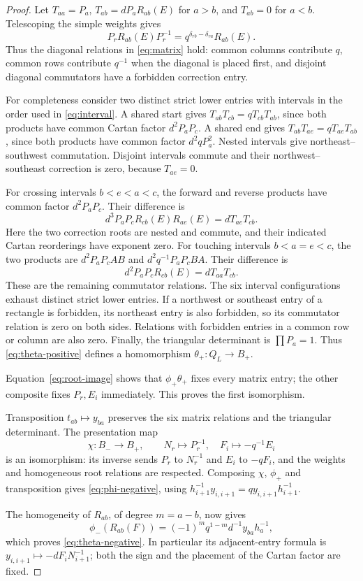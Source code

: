 \documentclass[11pt]{article}
\theoremstyle{definition}
\theoremstyle{remark}
\begin{document}
\begin{proof}
Let $T_{aa}=P_a$, $T_{ab}=dP_aR_{ab}(E)$ for $a>b$, and $T_{ab}=0$ for $a<b$. Telescoping the simple weights gives
\[
 P_rR_{ab}(E)P_r^{-1}=q^{\delta_{rb}-\delta_{ra}}R_{ab}(E).
\]
Thus the diagonal relations in \eqref{eq:matrix} hold: common columns contribute $q$, common rows contribute $q^{-1}$ when the diagonal is placed first, and disjoint diagonal commutators have a forbidden correction entry.

For completeness consider two distinct strict lower entries with intervals in the order used in \eqref{eq:interval}. A shared start gives
$T_{ab}T_{cb}=qT_{cb}T_{ab}$, since both products have common Cartan factor $d^2P_aP_c$. A shared end gives
$T_{ab}T_{ae}=qT_{ae}T_{ab}$, since both products have common factor $d^2qP_a^2$. Nested intervals give northeast--southwest commutation. Disjoint intervals commute and their northwest--southeast correction is zero, because $T_{ae}=0$.

For crossing intervals $b<e<a<c$, the forward and reverse products have common factor $d^2P_aP_c$. Their difference is
\[
 d^3P_aP_cR_{cb}(E)R_{ae}(E)=dT_{ae}T_{cb}.
\]
Here the two correction roots are nested and commute, and their indicated Cartan reorderings have exponent zero. For touching intervals $b<a=e<c$, the two products are $d^2P_aP_cAB$ and $d^2q^{-1}P_aP_cBA$. Their difference is
\[
 d^2P_aP_cR_{cb}(E)=dT_{aa}T_{cb}.
\]
These are the remaining commutator relations. The six interval configurations exhaust distinct strict lower entries. If a northwest or southeast entry of a rectangle is forbidden, its northeast entry is also forbidden, so its commutator relation is zero on both sides. Relations with forbidden entries in a common row or column are also zero. Finally, the triangular determinant is $\prod P_a=1$. Thus \eqref{eq:theta-positive} defines a homomorphism $\theta_+:Q_L\to B_+$.

Equation~\eqref{eq:root-image} shows that $\phi_+\theta_+$ fixes every matrix entry; the other composite fixes $P_r,E_i$ immediately. This proves the first isomorphism.

Transposition $t_{ab}\mapsto y_{ba}$ preserves the six matrix relations and the triangular determinant. The presentation map
\[
 \chi:B_-\longrightarrow B_+,\qquad N_r\longmapsto P_r^{-1},\quad F_i\longmapsto-q^{-1}E_i
\]
is an isomorphism: its inverse sends $P_r$ to $N_r^{-1}$ and $E_i$ to $-qF_i$, and the weights and homogeneous root relations are respected. Composing $\chi$, $\phi_+$ and transposition gives \eqref{eq:phi-negative}, using
$h_{i+1}^{-1}y_{i,i+1}=qy_{i,i+1}h_{i+1}^{-1}$.

The homogeneity of $R_{ab}$, of degree $m=a-b$, now gives
\[
 \phi_-(R_{ab}(F))=(-1)^m q^{1-m}d^{-1}y_{ba}h_a^{-1},
\]
which proves \eqref{eq:theta-negative}. In particular its adjacent-entry formula is $y_{i,i+1}\mapsto-dF_iN_{i+1}^{-1}$; both the sign and the placement of the Cartan factor are fixed.
\end{proof}
\end{document}
